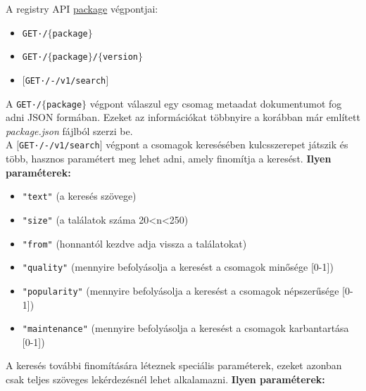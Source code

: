A registry API \underline{package} végpontjai:

\begin{itemize}
	\item \texttt{GET·/$\bigl\{$package$\bigr\}$}
	\item \texttt{GET·/$\bigl\{$package$\bigr\}$/$\bigl\{$version$\bigr\}$}
	\item \texttt{$\big[$GET·/-/v1/search$\big]$}
\end{itemize}

A \texttt{GET·/$\bigl\{$package$\bigr\}$} végpont válaszul egy csomag metaadat dokumentumot fog adni JSON formában. Ezeket az információkat többnyire a korábban már említett \emph{package.json} fájlból szerzi be.\\

A \texttt{$\big[$GET·/-/v1/search$\big]$} végpont a csomagok keresésében kulcsszerepet játszik és több, hasznos paramétert meg lehet adni, amely finomítja a keresést.
\textbf{Ilyen paraméterek:}

\begin{itemize}
	\item \texttt{"text"} (a keresés szövege)
	\item \texttt{"size"} (a találatok száma 20<n<250)
	\item \texttt{"from"} (honnantól kezdve adja vissza a találatokat)
	\item \texttt{"quality"} (mennyire befolyásolja a keresést a csomagok minősége [0-1])
	\item \texttt{"popularity"} (mennyire befolyásolja a keresést a csomagok népszerűsége [0-1])
	\item \texttt{"maintenance"} (mennyire befolyásolja a keresést a csomagok karbantartása  [0-1])
\end{itemize}

\pagebreak

A keresés további finomítására léteznek speciális paraméterek, ezeket azonban csak teljes szöveges lekérdezésnél lehet alkalamazni.
\textbf{Ilyen paraméterek:}

